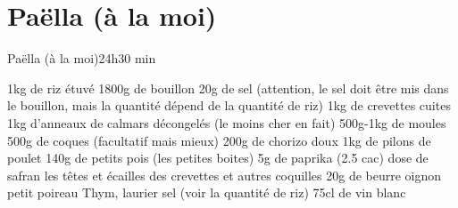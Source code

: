 {\section{Paëlla (à la moi)}
\begin{recette}{Paëlla (à la moi)}{2}{4h}{30 min}
\begin{ingredients}
\ingredient[Paella]
\ingredient 1kg de riz étuvé
\ingredient 1800g de bouillon
\ingredient 20g de sel (attention, le sel doit être mis dans le bouillon, mais la quantité dépend de la quantité de riz)
\ingredient 1kg de crevettes cuites
\ingredient 1kg d'anneaux de calmars décongelés (le moins cher en fait)
\ingredient 500g-1kg de moules
\ingredient 500g de coques (facultatif mais mieux)
\ingredient 200g de chorizo doux
\ingredient 1kg de pilons de poulet
\ingredient 140g de petits pois (les petites boites)
\ingredient 5g de paprika (2.5 cac)
 dose de safran
\ingredient les têtes et écailles des crevettes et autres coquilles
\ingredient 20g de beurre
 oignon
 petit poireau
\ingredient Thym, laurier
\ingredient sel (voir la quantité de riz)
\ingredient 75cl de vin blanc
\end{ingredients}


\end{recette}}

